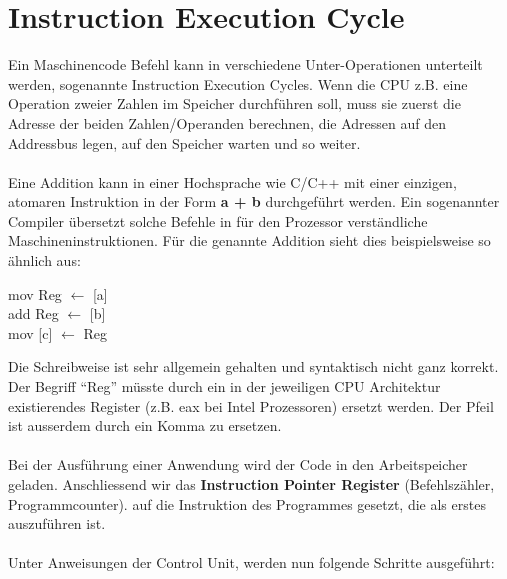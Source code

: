 \documentclass[a4paper,10pt]{report}
\begin{document}
\section{Instruction Execution Cycle}
Ein Maschinencode Befehl kann in verschiedene Unter-Operationen unterteilt werden, sogenannte Instruction Execution Cycles. Wenn die CPU z.B. eine Operation zweier Zahlen im Speicher durchführen soll, muss sie zuerst die Adresse der beiden Zahlen/Operanden berechnen, die Adressen auf den Addressbus legen, auf den Speicher warten und so weiter. \\ \\
Eine Addition kann in einer Hochsprache wie C/C++ mit einer einzigen, atomaren Instruktion in der Form \textbf{a + b} durchgeführt werden. Ein sogenannter Compiler übersetzt solche Befehle in für den Prozessor verständliche Maschineninstruktionen. Für die genannte Addition sieht dies beispielsweise so ähnlich aus:
\begin{center}
mov Reg $\leftarrow$ [a]\\
add Reg $\leftarrow$ [b]\\
mov [c] $\leftarrow$ Reg\\
\end{center}
Die Schreibweise ist  sehr allgemein gehalten und syntaktisch nicht ganz korrekt. Der Begriff "`Reg"' müsste durch ein in der jeweiligen CPU Architektur existierendes Register (z.B. eax bei Intel Prozessoren) ersetzt werden. Der Pfeil ist ausserdem durch ein Komma zu ersetzen. \\ \\
Bei der Ausführung einer Anwendung wird der Code in den Arbeitspeicher geladen. Anschliessend wir das \textbf{Instruction Pointer Register} (Befehlszähler, Programmcounter). auf die Instruktion des Programmes gesetzt, die als erstes auszuführen ist.  \\ \\
Unter Anweisungen der Control Unit, werden nun folgende Schritte ausgeführt:
\end{document}
